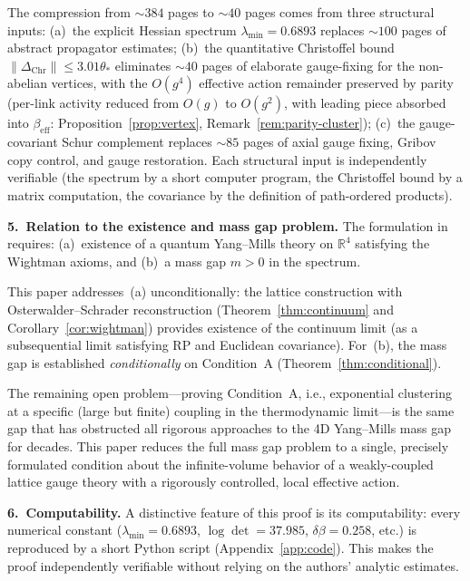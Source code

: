 \documentclass[11pt]{article}
\theoremstyle{definition}
\newcommand{\R}{\mathbb{R}}
\begin{document}
\noindent The compression from ${\sim}384$ pages to ${\sim}40$ pages
comes from three structural inputs: (a)~the explicit Hessian spectrum
$\lambda_{\min}=0.6893$ replaces ${\sim}100$ pages of abstract
propagator estimates; (b)~the quantitative Christoffel bound
$\|\Delta_{\mathrm{Chr}}\|\le 3.01\theta_*$ eliminates ${\sim}40$ pages
of elaborate gauge-fixing for the non-abelian vertices, with the
$O(g^4)$ effective action remainder preserved by parity
(per-link activity reduced from $O(g)$ to $O(g^2)$,
with leading piece absorbed into $\beta_{\mathrm{eff}}$:
Proposition~\ref{prop:vertex}, Remark~\ref{rem:parity-cluster});
(c)~the gauge-covariant Schur complement replaces ${\sim}85$ pages
of axial gauge fixing, Gribov copy control, and gauge restoration.
Each structural input is independently verifiable (the spectrum by a
short computer program, the Christoffel bound by a matrix computation,
the covariance by the definition of path-ordered products).

\medskip\noindent\textbf{5.~Relation to the existence and mass gap problem.}
The formulation in~\cite{JaffeWitten} requires:
(a)~existence of a quantum Yang--Mills theory on $\R^4$ satisfying the
Wightman axioms, and (b)~a mass gap $m>0$ in the spectrum.

This paper addresses~(a) unconditionally: the lattice construction with
Osterwalder--Schrader reconstruction (Theorem~\ref{thm:continuum} and
Corollary~\ref{cor:wightman}) provides existence of the continuum limit
(as a subsequential limit satisfying RP and Euclidean covariance).
For~(b), the mass gap is established \emph{conditionally} on
Condition~A (Theorem~\ref{thm:conditional}).

The remaining open problem---proving Condition~A, i.e., exponential
clustering at a specific (large but finite) coupling in the
thermodynamic limit---is the same gap that has obstructed all
rigorous approaches to the 4D Yang--Mills mass gap for decades.
This paper reduces the full mass gap problem to a single,
precisely formulated condition about the infinite-volume behavior
of a weakly-coupled lattice gauge theory with a rigorously
controlled, local effective action.

\medskip\noindent\textbf{6.~Computability.}
A distinctive feature of this proof is its computability: every
numerical constant ($\lambda_{\min}=0.6893$, $\log\det=37.985$,
$\delta\beta=0.258$, etc.) is reproduced by a short Python script
(Appendix~\ref{app:code}).  This makes the proof independently
verifiable without relying on the authors' analytic estimates.
\end{document}
